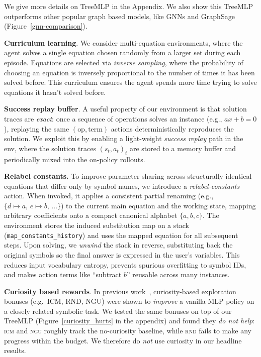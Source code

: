 \documentclass{article}
\theoremstyle{plain}
\theoremstyle{definition}
\theoremstyle{remark}
\begin{document}
We give more details on TreeMLP in the Appendix. We also show this TreeMLP outperforms other popular graph based models, like GNNs and GraphSage (Figure~\ref{gnn-comparison}). 

\textbf{Curriculum learning}. We consider multi-equation environments, where the agent solves a single equation chosen randomly from a larger set during each episode. Equations are selected via \textit{inverse sampling}, where the probability of choosing an equation is inversely proportional to the number of times it has been solved before. This curriculum ensures the agent spends more time trying to solve equations it hasn't solved before.

\textbf{Success replay buffer}. A useful property of our environment is that solution traces are \emph{exact}: once a sequence of operations solves an instance (e.g., $ax+b=0$), replaying the same $(\text{op},\text{term})$ actions deterministically reproduces the solution. We exploit this by enabling a light-weight \emph{success replay} path in the env, where the solution traces $(s_t, a_t)_t$ are stored to a memory buffer and periodically mixed into the on-policy rollouts.

\textbf{Relabel constants.} To improve parameter sharing across structurally identical equations that differ only by symbol names, we introduce a \emph{relabel-constants} action.
When invoked, it applies a consistent partial renaming (e.g., $\{d\!\mapsto\!a,\, e\!\mapsto\!b,\, \dots\}$) to the current main equation and the working state, mapping arbitrary coefficients onto a compact canonical alphabet $\{a,b,c\}$. The environment stores the induced substitution map on a stack (\texttt{map\_constants\_history}) and uses the mapped equation for all subsequent steps. Upon solving, we \emph{unwind} the stack in reverse, substituting back the original symbols so the final answer is expressed in the user’s variables. This reduces input vocabulary entropy, prevents spurious overfitting to symbol IDs, and makes action terms like ``subtract $b$'' reusable across many instances.

\textbf{Curiosity based rewards}. In previous work~\cite{dabelow2024symbolic}, curiosity-based exploration bonuses (e.g.\ ICM, RND, NGU) were shown to \emph{improve} a vanilla MLP policy on a closely related symbolic task. We tested the same bonuses on top of our TreeMLP (Figure~\ref{curiosity_hurts} in the appendix) and found they \emph{do not help}: \textsc{icm} and \textsc{ngu} roughly track the no-curiosity baseline, while \textsc{rnd} fails to make any progress within the budget. We therefore do \textit{not} use curiosity in our headline results.
\end{document}
